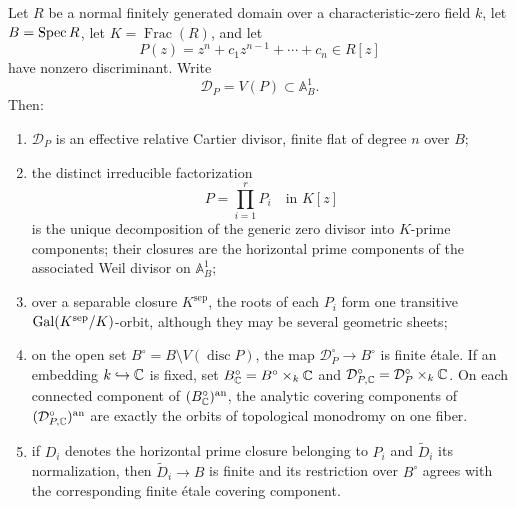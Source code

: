 \begin{theorem}
\label{thm:relative-zero-divisor-decomposition}
Let $R$ be a normal finitely generated domain over a characteristic-zero field
$k$,
let $B=\operatorname{Spec} R$, let $K=\operatorname{Frac}(R)$, and let
\[
 P(z)=z^n+c_1z^{n-1}+\cdots+c_n\in R[z]
\]
have nonzero discriminant.  Write
\[
 \mathcal D_P=V(P)\subset\mathbb A^1_B.
\]
Then:
\begin{enumerate}
\item $\mathcal D_P$ is an effective relative Cartier divisor, finite flat of
degree $n$ over $B$;
\item the distinct irreducible factorization
\begin{equation}
 P=\prod_{i=1}^r P_i\quad\text{in }K[z]
 \label{eq:generic-history-factorization}
\end{equation}
is the unique decomposition of the generic zero divisor into $K$-prime
components; their closures are the horizontal prime components of the associated
Weil divisor on $\mathbb A^1_B$;
\item over a separable closure $K^{\mathrm{sep}}$, the roots of each $P_i$ form
one transitive $\operatorname{Gal}(K^{\mathrm{sep}}/K)$-orbit, although they may be several
geometric sheets;
\item on the open set
$B^\circ=B\setminus V(\operatorname{disc}P)$, the map
$\mathcal D_P^\circ\to B^\circ$ is finite \'etale.  If an embedding $k\hookrightarrow
\mathbb{C}$ is fixed, set $B_{\mathbb{C}}^\circ=B^\circ\times_k\mathbb{C}$ and
$\mathcal D_{P,\mathbb{C}}^\circ=\mathcal D_P^\circ\times_k\mathbb{C}$.  On each connected
component of $(B_{\mathbb{C}}^\circ)^{\mathrm{an}}$, the analytic covering components of
$(\mathcal D_{P,\mathbb{C}}^\circ)^{\mathrm{an}}$ are exactly the orbits of topological
monodromy on one fiber.
\item if $D_i$ denotes the horizontal prime closure belonging to $P_i$ and
$\widetilde D_i$ its normalization, then $\widetilde D_i\to B$ is finite and its
restriction over $B^\circ$ agrees with the corresponding finite \'etale covering
component.
\end{enumerate}
\end{theorem}

